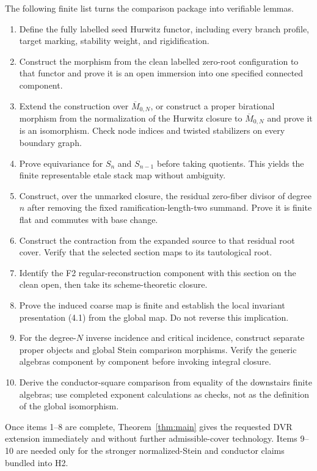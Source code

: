 \documentclass[11pt]{article}
\newcommand{\ol}{\overline}
\begin{document}
The following finite list turns the comparison package into verifiable
lemmas.
\begin{enumerate}
\item Define the fully labelled seed Hurwitz functor, including every branch
profile, target marking, stability weight, and rigidification.
\item Construct the morphism from the clean labelled zero-root
configuration to that functor and prove it is an open immersion into one
specified connected component.
\item Extend the construction over $\ol M_{0,N}$, or construct a proper
birational morphism from the normalization of the Hurwitz closure to
$\ol M_{0,N}$ and prove it is an isomorphism.  Check node indices and twisted
stabilizers on every boundary graph.
\item Prove equivariance for $S_n$ and $S_{n-1}$ before taking quotients.
This yields the finite representable etale stack map without ambiguity.
\item Construct, over the unmarked closure, the residual zero-fiber divisor
of degree $n$ after removing the fixed ramification-length-two summand.
Prove it is finite flat and commutes with base change.
\item Construct the contraction from the expanded source to that residual
root cover.  Verify that the selected section maps to its tautological root.
\item Identify the F2 regular-reconstruction component with this section on
the clean open, then take its scheme-theoretic closure.
\item Prove the induced coarse map is finite and establish the local
invariant presentation (4.1) from the global map.  Do not reverse this
implication.
\item For the degree-$N$ inverse incidence and critical incidence, construct
separate proper objects and global Stein comparison morphisms.  Verify the
generic algebras component by component before invoking integral closure.
\item Derive the conductor-square comparison from equality of the downstairs
finite algebras; use completed exponent calculations as checks, not as the
definition of the global isomorphism.
\end{enumerate}

Once items 1--8 are complete, Theorem~\ref{thm:main} gives the requested DVR
extension immediately and without further admissible-cover technology.
Items 9--10 are needed only for the stronger normalized-Stein and conductor
claims bundled into H2.
\end{document}
